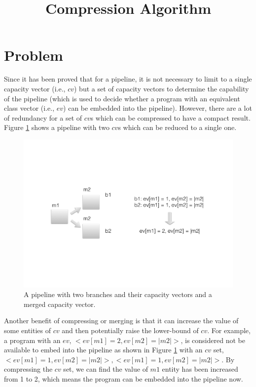 \documentclass{article}
\title{Compression Algorithm}
\begin{document}
\maketitle

\section{Problem}

Since it has been proved that for a pipeline, it is not necessary to limit to a single capacity vector (i.e., $cv$) but a set of capacity vectors to determine the capability of the pipeline (which is used to decide whether a program with an equivalent class vector (i.e., $ev$) can be embedded into the pipeline). However, there are a lot of redundancy for a set of $cv$s which can be compressed to have a compact result. Figure \ref{fig:problem} shows a pipeline with two $cv$s which can be reduced to a single one. 

\begin{figure}
  \includegraphics[width=\linewidth]{figures/example.pdf}
  \caption{A pipeline with two branches and their capacity vectors and a merged capacity vector.}
  \label{fig:problem}
\end{figure}

Another benefit of compressing or merging is that it can increase the value of some entities of $cv$ and then potentially raise the lower-bound of $cv$. For example, a program with an $ev$, $<ev[m1] = 2, ev[m2] = |m2|>$, is considered not be available to embed into the pipeline as shown in Figure \ref{fig:problem} with an $cv$ set, $<ev[m1] = 1, ev[m2] = |m2|>, <ev[m1] = 1, ev[m2] = |m2|>$. By compressing the $cv$ set, we can find the value of $m1$ entity has been increased from 1 to 2, which means the program can be embedded into the pipeline now.
\end{document}
